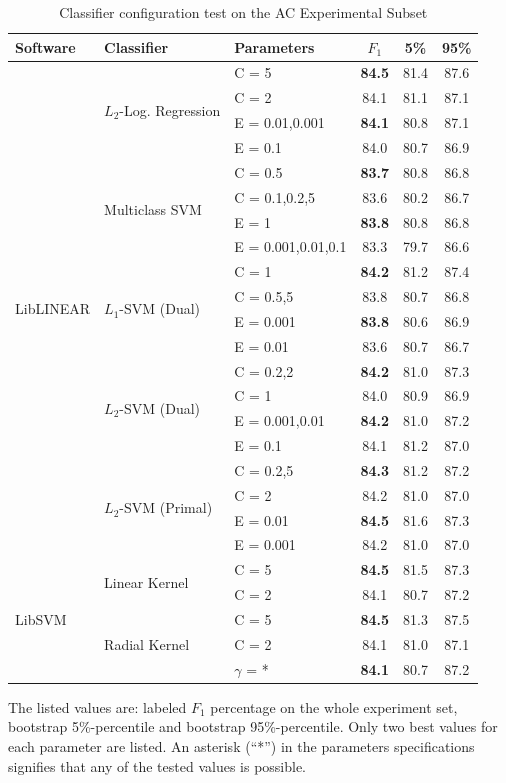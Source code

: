 \documentclass[12pt,notitlepage]{report}
\begin{document}
\begin{table}[htb]
\caption{Classifier configuration test on the AC Experimental Subset}\label{tab:ac-classifiers}\footnotesize
\begin{center}
\begin{tabular}{|l|l|l|c|c|c|}\hline
\bf Software & \bf Classifier & \bf Parameters & \bf $F_1$ & \bf 5\% & \bf 95\% \\\hline
\multirow{20}{*}{LibLINEAR} & \multirow{4}{*}{$L_2$-Log. Regression} & C = 5 & \bf 84.5 & 81.4 & 87.6 \\
 & & C = 2 & 84.1 & 81.1 & 87.1 \\\cline{3-6}
 & & E = 0.01,0.001 & \bf 84.1 & 80.8 & 87.1 \\
 & & E = 0.1 & 84.0 & 80.7 & 86.9 \\\cline{2-6}
 & \multirow{4}{*}{Multiclass SVM} & C = 0.5 & \bf 83.7 & 80.8 & 86.8 \\ 
 & & C = 0.1,0.2,5 & 83.6 & 80.2 & 86.7 \\\cline{3-6}
 & & E = 1 & \bf 83.8 & 80.8 & 86.8 \\
 & & E = 0.001,0.01,0.1 & 83.3 & 79.7 & 86.6 \\\cline{2-6}
 & \multirow{4}{*}{$L_1$-SVM (Dual)} & C = 1 & \bf 84.2 & 81.2 & 87.4 \\
 & & C = 0.5,5 & 83.8 & 80.7 & 86.8 \\\cline{3-6}
 & & E = 0.001 & \bf 83.8 & 80.6 & 86.9 \\
 & & E = 0.01 & 83.6 & 80.7 & 86.7 \\\cline{2-6}
 & \multirow{4}{*}{$L_2$-SVM (Dual)} & C = 0.2,2 & \bf 84.2 & 81.0 & 87.3 \\
 & & C = 1 & 84.0 & 80.9 & 86.9 \\\cline{3-6}
 & & E = 0.001,0.01 & \bf 84.2 & 81.0 & 87.2 \\
 & & E = 0.1 & 84.1 & 81.2 & 87.0 \\\cline{2-6}
 & \multirow{4}{*}{$L_2$-SVM (Primal)} & C = 0.2,5 & \bf 84.3 & 81.2 & 87.2 \\
 & & C = 2 & 84.2 & 81.0 & 87.0 \\\cline{3-6}
 & & E = 0.01 & \bf 84.5 & 81.6 & 87.3 \\
 & & E = 0.001 & 84.2 & 81.0 & 87.0 \\\hline
 \multirow{5}{*}{LibSVM} & \multirow{2}{*}{Linear Kernel} & C = 5 & \bf 84.5 & 81.5 & 87.3 \\
 & & C = 2 & 84.1 & 80.7 & 87.2 \\\cline{2-6}
 & \multirow{3}{*}{Radial Kernel} & C = 5 & \bf 84.5 & 81.3 & 87.5 \\
 & & C = 2 & 84.1 & 81.0 & 87.1 \\\cline{3-6}
 & & $\gamma$ = * & \bf 84.1 & 80.7 & 87.2 \\\hline
\end{tabular}
\end{center}
The listed values are: labeled $F_1$ percentage on the whole experiment set, bootstrap 5\%-percentile and bootstrap 95\%-percentile. Only two best values for each parameter are listed. An asterisk (``*'') in the parameters specifications signifies that any of the tested values is possible.
\end{table}
\end{document}
